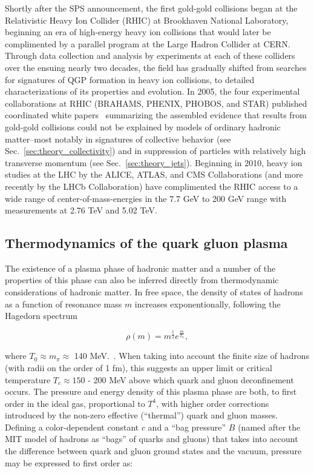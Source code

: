 Shortly after the SPS announcement, the first gold-gold collisions began at the Relativistic Heavy Ion Collider (RHIC) at Brookhaven National Laboratory, beginning an era of high-energy heavy ion collisions that would later be complimented by a parallel program at the Large Hadron Collider at CERN.  Through data collection and analysis by experiments at each of these colliders over the ensuing nearly two decades, the field has gradually shifted from searches for signatures of QGP formation in heavy ion collisions, to detailed characterizations of its properties and evolution.  In 2005, the four experimental collaborations at RHIC (BRAHAMS, PHENIX, PHOBOS, and STAR) published coordinated white papers~\cite{Arsene:2004fa, Adcox:2004mh, Back:2004je, Adams:2005dq} summarizing the assembled evidence that results from  gold-gold collisions could not be explained by models of ordinary hadronic matter--most notably in signatures of collective behavior (see Sec.~\ref{sec:theory_collectivity}) and in suppression of particles with relatively high transverse momentum (see Sec.~\ref{sec:theory_jets}).  Beginning in 2010, heavy ion studies at the LHC by the ALICE, ATLAS, and CMS Collaborations (and more recently by the LHCb Collaboration) have complimented the RHIC access to a wide range of center-of-mass-energies in the 7.7 GeV to 200 GeV range with measurements at 2.76 TeV and 5.02 TeV.

\subsection{Thermodynamics of the quark gluon plasma}

The existence of a plasma phase of hadronic matter and a number of the properties of this phase can also be inferred directly from thermodynamic considerations of hadronic matter.  In free space, the density of states of hadrons as a function of resonance mass $m$ increases exponentionally, following the Hagedorn spectrum

\begin{equation}
\label{eq:hagedorn}
\rho(m) = m^{\frac{5}{2}}e^{\frac{m}{T_{0}}},
\end{equation} 

\noindent where $T_{0} \approx m_{\pi} \approx $ 140 MeV.~\cite{Gyulassy:1985, Sarkar:2010zza}.  When taking into account the finite size of hadrons (with radii on the order of 1 fm), this suggests an upper limit or critical temperature $T_{c} \approx 150$ - 200 MeV above which quark and gluon deconfinement occurs.  The pressure and energy density of this plasma phase are both, to first order in the ideal gas, proportional to $T^4$, with higher order corrections introduced by the non-zero effective (``thermal'') quark and gluon masses.  Defining a color-dependent constant $c$ and a ``bag pressure'' $B$ (named after the MIT model of hadrons as ``bags'' of quarks and gluons) that takes into account the difference between quark and gluon ground states and the vacuum, pressure may be expressed to first order as: 

